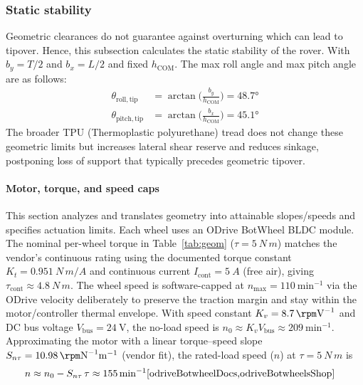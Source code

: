 \documentclass[letterpaper, 10 pt, conference]{ieeeconf}  %
\begin{document}
\subsubsection{Static stability}\label{subsec:static-stability}

Geometric clearances do not guarantee against overturning which can lead to tipover. Hence, this subsection calculates the static stability of the rover.  
With \(b_y=T/2\) and \(b_x=L/2\) and fixed \(h_{\mathrm{COM}}\). The max roll angle and max pitch angle are as follows:
\begin{equation}
\begin{aligned}
\theta_{\mathrm{roll,tip}}  &= \arctan\!\Big(\tfrac{b_y}{h_{\mathrm{COM}}}\Big) = \ang{48.7}\\
\theta_{\mathrm{pitch,tip}} &= \arctan\!\Big(\tfrac{b_x}{h_{\mathrm{COM}}}\Big) = \ang{45.1}
\end{aligned}
\end{equation}
The broader TPU (Thermoplastic polyurethane) tread does not change these geometric limits but increases lateral shear reserve and reduces sinkage, postponing loss of support that typically precedes geometric tipover.

\paragraph*{Motor, torque, and speed caps}
This section analyzes and translates geometry into attainable slopes/speeds and specifies actuation limits. Each wheel uses an ODrive BotWheel BLDC module. The nominal per-wheel torque in Table~\ref{tab:geom}
($\tau=\SI{5}{N\,m}$) matches the vendor’s continuous rating using the documented
torque constant $K_t=\SI{0.951}{N\,m/A}$ and continuous current $I_{\mathrm{cont}}=\SI{5}{A}$ (free air),
giving $\tau_{\mathrm{cont}}\approx \SI{4.8}{N\,m}$. The wheel speed is software-capped at $n_{\max}=\SI{110}{\minute^{-1}}$ via the ODrive velocity deliberately to preserve the traction margin and stay within the motor/controller thermal envelope. With speed constant $K_v=\SI{8.7}{\rpm\volt^{-1}}$ and DC bus voltage $V_{\mathrm{bus}}=\SI{24}{\volt}$, the no-load speed is
$n_0\approx K_v V_{\mathrm{bus}}\approx \SI{209}{\minute^{-1}}$. Approximating the motor with a linear
torque–speed slope $S_{n\tau}=\SI{10.98}{\rpm\newton^{-1}\metre^{-1}}$ (vendor fit),
the rated-load speed ($n$) at $\tau=\SI{5}{N\,m}$ is
\[
\begin{aligned}
n &\approx n_0 - S_{n\tau}\,\tau \approx \SI{155}{\minute^{-1}}                        \cite{odriveBotwheelDocs,odriveBotwheelsShop}
\end{aligned}
\] 
\end{document}
